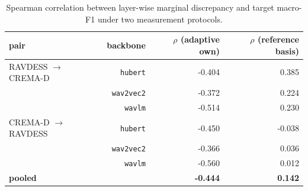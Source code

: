 \begin{table}[!t]
  \centering
  \caption{Spearman correlation between layer-wise marginal discrepancy and target macro-F1 under two measurement protocols.}
  \label{tab:frames}
  \begin{tabular}{lrrr}
    \toprule
    pair & backbone & $\rho$ (adaptive own) & $\rho$ (reference basis) \\
    \midrule
    RAVDESS $\rightarrow$ CREMA-D & \texttt{hubert} & -0.404 & 0.385 \\
     & \texttt{wav2vec2} & -0.372 & 0.224 \\
     & \texttt{wavlm} & -0.514 & 0.230 \\
    CREMA-D $\rightarrow$ RAVDESS & \texttt{hubert} & -0.450 & -0.038 \\
     & \texttt{wav2vec2} & -0.366 & 0.036 \\
     & \texttt{wavlm} & -0.560 & 0.012 \\
    \textbf{pooled} &  & \textbf{-0.444} & \textbf{0.142} \\
    \bottomrule
  \end{tabular}
\end{table}
